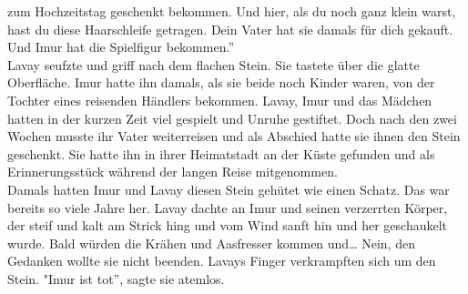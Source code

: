 zum Hochzeitstag geschenkt bekommen. Und hier, als du noch ganz klein warst, hast du diese 
Haarschleife getragen. Dein Vater hat sie damals für dich gekauft. Und Imur hat die Spielfigur 
bekommen.''\\
Lavay seufzte und griff nach dem flachen Stein. Sie tastete über die glatte Oberfläche. Imur hatte 
ihn damals, als sie beide noch Kinder waren, von der Tochter eines reisenden Händlers bekommen. 
Lavay, Imur und das Mädchen hatten in der kurzen Zeit viel gespielt und Unruhe gestiftet. Doch nach 
den zwei Wochen musste ihr Vater weiterreisen und als Abschied hatte sie ihnen den Stein geschenkt. 
Sie hatte ihn in ihrer Heimatstadt an der Küste gefunden und als Erinnerungsstück während der 
langen Reise mitgenommen.\\ 
Damals hatten Imur und Lavay diesen Stein gehütet wie einen Schatz. Das war bereits so viele Jahre 
her. Lavay dachte an Imur und seinen verzerrten Körper, der steif und kalt am Strick hing und vom 
Wind sanft hin und her geschaukelt wurde. Bald würden die Krähen und Aasfresser kommen und…
Nein, den Gedanken wollte sie nicht beenden. Lavays Finger verkrampften sich um den Stein.
"Imur ist tot'', sagte sie atemlos. \\


